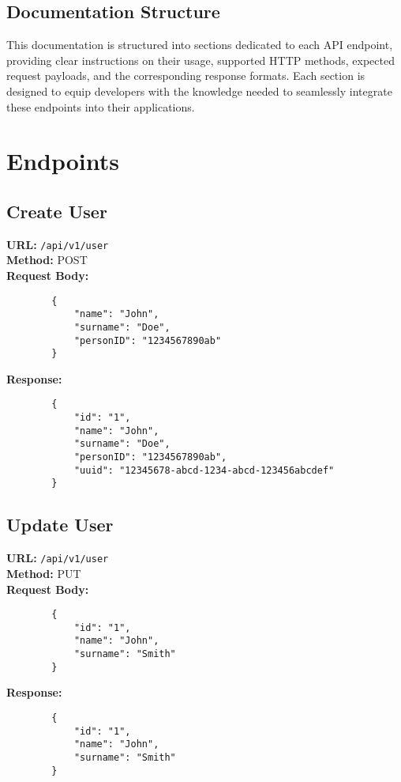 \documentclass[12pt]{article}
\begin{document}
	\subsection{Documentation Structure}

	This documentation is structured into sections dedicated to each API endpoint, providing clear instructions on their usage, supported HTTP methods, expected request payloads, and the corresponding response formats. Each section is designed to equip developers with the knowledge needed to seamlessly integrate these endpoints into their applications.

	\newpage

	\section{Endpoints}

	\subsection{Create User}

	\textbf{URL:} \texttt{/api/v1/user} \\
	\textbf{Method:} POST \\
	\textbf{Request Body:}
	\begin{verbatim}
		{
			"name": "John",
			"surname": "Doe",
			"personID": "1234567890ab"
		}
	\end{verbatim}
	\textbf{Response:}
	\begin{verbatim}
		{
			"id": "1",
			"name": "John",
			"surname": "Doe",
			"personID": "1234567890ab",
			"uuid": "12345678-abcd-1234-abcd-123456abcdef"
		}
	\end{verbatim}

	\newpage

	\subsection{Update User}

	\textbf{URL:} \texttt{/api/v1/user} \\
	\textbf{Method:} PUT \\
	\textbf{Request Body:}
	\begin{verbatim}
		{
			"id": "1",
			"name": "John",
			"surname": "Smith"
		}
	\end{verbatim}
	\textbf{Response:}
	\begin{verbatim}
		{
			"id": "1",
			"name": "John",
			"surname": "Smith"
		}
	\end{verbatim}
\end{document}
